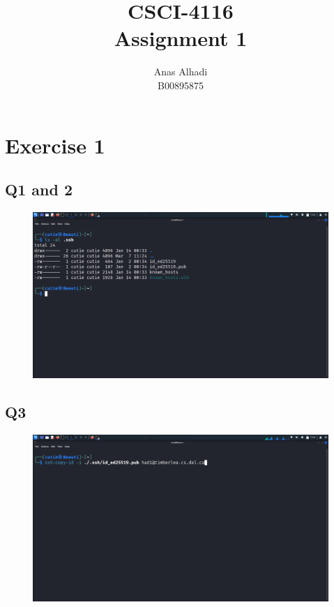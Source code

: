 \documentclass{article}
\title{\textbf{CSCI-4116\\Assignment 1}}
\author{Anas Alhadi\\B00895875}
\numberwithin{equation}{subsection}
\begin{document}
	\maketitle
	\tableofcontents


	\newpage
	\section{Exercise 1}
	\subsection{Q1 and 2}
	\begin{figure}[H]
		\includegraphics[width=430pt]{pics/q1/1.png}
	\end{figure}

	\vspace{25pt}

	\subsection{Q3}
	\begin{figure}[H]
		\includegraphics[width=430pt]{pics/q1/2.png}
	\end{figure}
\end{document}
